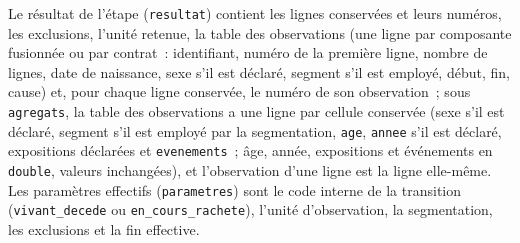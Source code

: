 \documentclass[a4paper,11pt]{article}
\newcommand{\code}[1]{\texttt{\small #1}}
\begin{document}
\medskip
Le résultat de l'étape (\code{resultat}) contient les lignes conservées et
leurs numéros, les exclusions, l'unité retenue, la table des observations
(une ligne par composante fusionnée ou par contrat~: identifiant, numéro de la
première ligne, nombre de lignes, date de naissance, sexe s'il est déclaré,
segment s'il est employé, début, fin, cause) et, pour chaque ligne conservée,
le numéro de son observation~; sous \code{agregats}, la table des
observations a une ligne par cellule conservée (sexe s'il est déclaré,
segment s'il est employé par la segmentation, \code{age}, \code{annee}
s'il est déclaré, expositions déclarées et \code{evenements}~; âge, année,
expositions et événements en \code{double}, valeurs inchangées), et l'observation d'une ligne est
la ligne elle-même. Les paramètres effectifs
(\code{parametres}) sont le code interne de la transition
(\code{vivant\_decede} ou \code{en\_cours\_rachete}), l'unité d'observation, la
segmentation, les exclusions et la fin effective.
\end{document}
